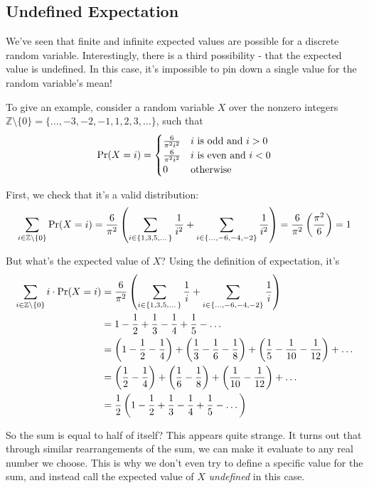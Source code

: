 \subsection{Undefined Expectation}
We've seen that finite and infinite expected values are possible for a discrete random variable. 
Interestingly, there is a third possibility - that the expected value is undefined. 
In this case, it's impossible to pin down a single value for the random variable's mean!

To give an example, consider a random variable $X$ over the nonzero integers $\mathbb{Z} \setminus \{0\} = \{\dots, -3, -2, -1, 1, 2, 3, \dots\}$, 
such that 
$$\mbox{\rm Pr}(X = i) = \begin{cases} \frac{6}{\pi^2 i^2} & i \text{ is odd and } i > 0 \\ \frac{6}{\pi^2 i^2} & i \text{ is even and } i < 0 \\ 0 & \text{otherwise} \end{cases} $$

First, we check that it's a valid distribution: 
$$ \sum_{i \in \mathbb{Z} \setminus \{0\}} \mbox{\rm Pr}(X = i)
= \frac{6}{\pi^2} \left( \sum_{i \in \{ 1, 3, 5, \dots \}} \frac{1}{i^2} + \sum_{i \in \{\dots, -6, -4, -2 \}} \frac{1}{i^2} \right) 
= \frac{6}{\pi^2} \left( \frac{\pi^2}{6} \right) = 1 $$

But what's the expected value of $X$? 
Using the definition of expectation, it's 
\begin{align*}
\sum_{i \in \mathbb{Z} \setminus \{0\}} i \cdot \mbox{\rm Pr}(X = i) 
&= \frac{6}{\pi^2} \left( \sum_{i \in \{ 1, 3, 5, \dots \}} \frac{1}{i} + \sum_{i \in \{\dots, -6, -4, -2 \}} \frac{1}{i} \right) \\
&= 1 - \frac{1}{2} + \frac{1}{3} - \frac{1}{4} + \frac{1}{5} - \dots \\
&= \left( 1 - \frac{1}{2} - \frac{1}{4} \right) + \left( \frac{1}{3} - \frac{1}{6} - \frac{1}{8} \right) + \left( \frac{1}{5} - \frac{1}{10} - \frac{1}{12} \right) + \dots \\
&= \left( \frac{1}{2} - \frac{1}{4} \right) + \left( \frac{1}{6} - \frac{1}{8} \right) + \left( \frac{1}{10} - \frac{1}{12} \right) + \dots \\
&= \frac{1}{2} \left( 1 - \frac{1}{2} + \frac{1}{3} - \frac{1}{4} + \frac{1}{5} - \dots \right)
\end{align*}

So the sum is equal to half of itself? 
This appears quite strange. 
It turns out that through similar rearrangements of the sum, 
we can make it evaluate to any real number we choose. 
This is why we don't even try to define a specific value for the sum, 
and instead call the expected value of $X$ \emph{undefined} in this case.

